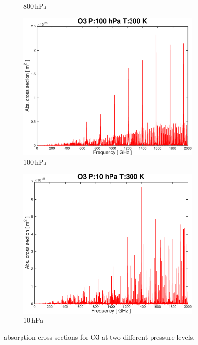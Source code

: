 \documentclass[paper=a4, fontsize=11pt]{scrartcl} %
\begin{document}
\begin{figure}[ht]
\begin{subfigure}[t]{0.45\textwidth}
        \caption{800\,hPa}
    \end{subfigure}
    \begin{subfigure}[b]{0.45\textwidth}
        \includegraphics[width=\textwidth]{plots/plot_xsec_O3_100hPa_300K.pdf}
        \caption{100\,hPa}
    \end{subfigure}
    \begin{subfigure}[b]{0.45\textwidth}
        \includegraphics[width=\textwidth]{plots/plot_xsec_O3_10hPa_300K.pdf}
        \caption{10\,hPa}
    \end{subfigure}

    \caption{absorption cross sections for O3 at two different pressure levels.}
    \label{fig:abs_pressure}
\end{figure}
\end{document}
